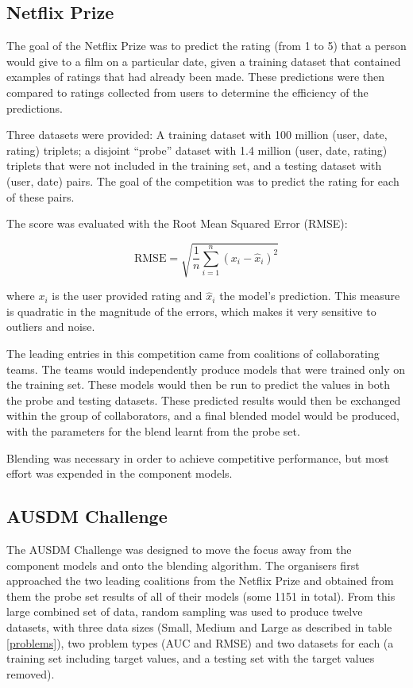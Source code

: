 \documentclass{article}
\begin{document}
\subsection{Netflix Prize}

The goal of the Netflix Prize was to predict the rating (from 1 to 5) that a person would give to a film on a particular date, given a training dataset that contained examples of ratings that had already been made.  These predictions were then compared to ratings collected from users to determine the efficiency of the predictions.

Three datasets were provided: A training dataset with 100 million (user, date, rating) triplets; a disjoint ``probe'' dataset with 1.4 million (user, date, rating) triplets that were not included in the training set, and a testing dataset with (user, date) pairs.  The goal of the competition was to predict the rating for each of these pairs.

The score was evaluated with the Root Mean Squared Error (RMSE):

\begin{equation}
\mathrm{RMSE} = \sqrt{\frac{1}{n} \sum_{i=1}^{n} (x_i - \hat{x}_i)^2}
\label{RMSE}
\end{equation}

where $x_i$ is the user provided rating and $\hat{x}_i$ the model's prediction.  This measure is quadratic in the magnitude of the errors, which makes it very sensitive to outliers and noise.

The leading entries in this competition came from coalitions of collaborating teams.  The teams would independently produce models that were trained only on the training set.  These models would then be run to predict the values in both the probe and testing datasets.  These predicted results would then be exchanged within the group of collaborators, and a final blended model would be produced, with the parameters for the blend learnt from the probe set.

Blending was necessary in order to achieve competitive performance, but most effort was expended in the component models.

\subsection{AUSDM Challenge}

The AUSDM Challenge was designed to move the focus away from the component models and onto the blending algorithm.  The organisers first approached the two leading coalitions from the Netflix Prize and obtained from them the probe set results of all of their models (some 1151 in total).  From this large combined set of data, random sampling was used to produce twelve datasets, with three data sizes (Small, Medium and Large as described in table \ref{problems}), two problem types (AUC and RMSE) and two datasets for each (a training set including target values, and a testing set with the target values removed).
\end{document}
